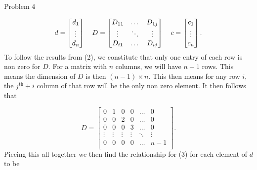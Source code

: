 \begin{problem}{Problem 4}
\begin{highlight}[Solution]
        \begin{equation}
            d = 
            \begin{bmatrix}
                d_{1} \\
                \vdots \\
                d_{n} \\
            \end{bmatrix}
            \hspace*{10pt}
            D = 
            \begin{bmatrix}
                D_{11} & \dots & D_{1j} \\
                \vdots & \ddots & \vdots \\
                D_{i1} & \dots & D_{ij} \\
            \end{bmatrix}
            \hspace*{10pt}
            c = 
            \begin{bmatrix}
                c_{1} \\
                \vdots \\
                c_{n} \\
            \end{bmatrix}.
        \end{equation}
        To follow the results from (2), we constitute that only one entry of each row is non zero for $D$. For a matrix with $n$ columns, we will have $n - 1$ rows. This means the dimension of $D$ is 
        then $(n-1) \times n$. This then means for any row $i$, the $j^{\text{th}} + i$ column of that row will be the only non zero element. It then follows that

        \begin{equation}
            D = 
            \begin{bmatrix}
                0 & 1 & 0 & 0 & \dots & 0 \\
                0 & 0 & 2 & 0 & \dots & 0 \\
                0 & 0 & 0 & 3 & \dots & 0 \\
                \vdots & \vdots & \vdots & \vdots & \ddots & \vdots \\
                0 & 0 & 0 & 0 & \dots & n - 1 \\
            \end{bmatrix}.
        \end{equation}
        Piecing this all together we then find the relationship for (3) for each element of $d$ to be


\end{highlight}
\end{problem}
